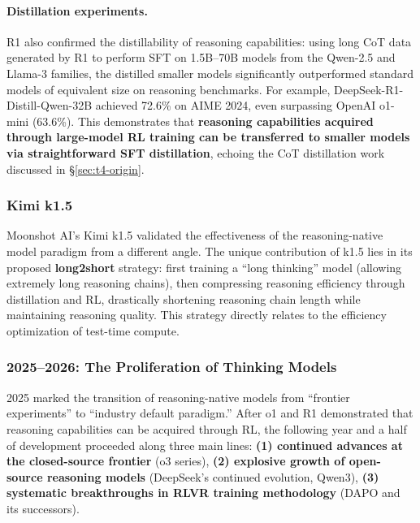 \paragraph{Distillation experiments.}
R1 also confirmed the distillability of reasoning capabilities:
using long CoT data generated by R1 to perform SFT on 1.5B--70B models from the Qwen-2.5 and Llama-3 families,
the distilled smaller models significantly outperformed standard models of equivalent size on reasoning benchmarks.
For example, DeepSeek-R1-Distill-Qwen-32B achieved 72.6\% on AIME 2024,
even surpassing OpenAI o1-mini (63.6\%).
This demonstrates that \textbf{reasoning capabilities acquired through large-model RL training
can be transferred to smaller models via straightforward SFT distillation},
echoing the CoT distillation work discussed in \S\ref{sec:t4-origin}.

\subsubsection{Kimi k1.5}

Moonshot AI's Kimi k1.5 \cite{moonshot2025kimi} validated the effectiveness of
the reasoning-native model paradigm from a different angle.
The unique contribution of k1.5 lies in its proposed \textbf{long2short} strategy:
first training a ``long thinking'' model (allowing extremely long reasoning chains),
then compressing reasoning efficiency through distillation and RL,
drastically shortening reasoning chain length while maintaining reasoning quality.
This strategy directly relates to the efficiency optimization of test-time compute.

\subsubsection{2025--2026: The Proliferation of Thinking Models}
\label{sec:t4-thinking-models}

2025 marked the transition of reasoning-native models from ``frontier experiments'' to ``industry default paradigm.''
After o1 and R1 demonstrated that reasoning capabilities can be acquired through RL,
the following year and a half of development proceeded along three main lines:
\textbf{(1) continued advances at the closed-source frontier} (o3 series),
\textbf{(2) explosive growth of open-source reasoning models} (DeepSeek's continued evolution, Qwen3),
\textbf{(3) systematic breakthroughs in RLVR training methodology} (DAPO and its successors).

